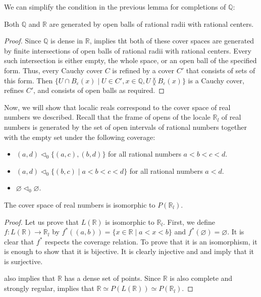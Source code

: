 \documentclass[reqno]{amsart}
\theoremstyle{definition}
\theoremstyle{remark}
\numberwithin{figure}{section}
\newcommand{\overlap}[2]{#1 \between #2}
\begin{document}
We can simplify the condition in the previous lemma for completions of $\mathbb{Q}$:

\begin{lem}
Both $\mathbb{Q}$ and $\mathbb{R}$ are generated by open balls of rational radii with rational centers.
\end{lem}
\begin{proof}
Since $\mathbb{Q}$ is dense in $\mathbb{R}$,  implies tht both of these cover spaces are generated by finite intersections of open balls of rational radii with rational centers.
Every such intersection is either empty, the whole space, or an open ball of the specified form.
Thus, every Cauchy cover $C$ is refined by a cover $C'$ that consists of sets of this form.
Then $\{ U \cap B_\varepsilon(x) \mid U \in C', x \in \mathbb{Q}, \overlap{U}{B_\varepsilon(x)} \}$ is a Cauchy cover, refines $C'$, and consists of open balls as required.
\end{proof}

Now, we will show that localic reals correspond to the cover space of real numbers we described.
Recall that the frame of opens of the locale $\mathbb{R}_l$ of real numbers is generated by the set of open intervals of rational numbers together with the empty set under the following coverage:
\begin{itemize}
\item $(a,d) \triangleleft_0 \{ (a,c), (b,d) \}$ for all rational numbers $a < b < c < d$.
\item $(a,d) \triangleleft_0 \{ (b,c) \mid a < b < c < d \}$ for all rational numbers $a < d$.
\item $\varnothing \triangleleft_0 \varnothing$.
\end{itemize}

\begin{prop}
The cover space of real numbers is isomorphic to $P(\mathbb{R}_l)$.
\end{prop}
\begin{proof}
Let us prove that $L(\mathbb{R})$ is isomorphic to $\mathbb{R}_l$.
First, we define $f : L(\mathbb{R}) \to \mathbb{R}_l$ by $f^*((a,b)) = \{ x \in \mathbb{R} \mid a < x < b \}$ and $f^*(\varnothing) = \varnothing$.
It is clear that $f^*$ respects the coverage relation.
To prove that it is an isomorphism, it is enough to show that it is bijective.
It is clearly injective and  and  imply that it is surjective.

 also implies that $\mathbb{R}$ has a dense set of points.
Since $\mathbb{R}$ is also complete and strongly regular,  implies that $\mathbb{R} \simeq P(L(\mathbb{R})) \simeq P(\mathbb{R}_l)$.
\end{proof}
\end{document}

